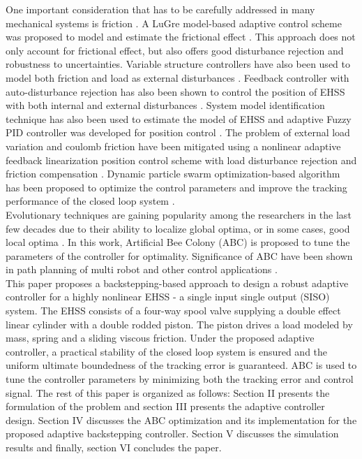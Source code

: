 \documentclass{article} %
\begin{document}
One important consideration that has to be carefully addressed in many mechanical systems is friction \cite{hutamarn_neuro-fuzzy_2012}. A LuGre model-based adaptive control scheme was proposed to model and estimate the frictional effect \cite{wang_high_2012}. This approach does not only account for frictional effect, but also offers good disturbance rejection and robustness to uncertainties. Variable structure controllers have also been used to model both friction and load as external disturbances \cite{bonchis_variable_2001}. Feedback controller with auto-disturbance rejection has also been shown to control the position of EHSS with both internal and external disturbances \cite{xiang_electro-hydraulic_2012}. System model identification technique has also been used to estimate the model of EHSS and adaptive Fuzzy PID controller was developed for position control \cite{shao_model_2009}. The problem of external load variation and coulomb friction have been mitigated using a nonlinear adaptive feedback linearization position control scheme with load disturbance rejection and friction compensation \cite{Mintsa_2011}. Dynamic particle swarm optimization-based algorithm has been proposed to optimize the control parameters and improve the tracking performance of the closed loop system \cite{lai_synchronization_2013}.
\\
\indent
Evolutionary techniques are gaining popularity among the researchers in the last few decades due to their ability to localize global optima, or in some cases, good local optima \cite{hashim2015fuzzy,hashim2015fuzzy2}. In this work, Artificial Bee Colony (ABC) \cite{Karaboga_2005,Karaboga_2007} is proposed to tune the parameters of the controller for optimality. Significance of ABC have been shown in path planning of multi robot and other control applications \cite{bhattacharjee_multi-robot_2011}.\\
\indent
This paper proposes a backstepping-based approach to design a robust adaptive controller for a highly nonlinear EHSS - a single input single output (SISO) system. The EHSS consists of a four-way spool valve supplying a double effect linear cylinder with a double rodded piston. The piston drives a load modeled by mass, spring and a sliding viscous friction. Under the proposed adaptive controller, a practical stability of the closed loop system is ensured and the uniform ultimate boundedness of the tracking error is guaranteed. ABC is used to tune the controller parameters by minimizing both the tracking error and control signal. The rest of this paper is organized as follows: Section II presents the formulation of the problem and section III presents the adaptive controller design. Section IV discusses the ABC optimization and its implementation for the proposed adaptive backstepping controller. Section V discusses the simulation results and finally, section VI concludes the paper.
\end{document}
